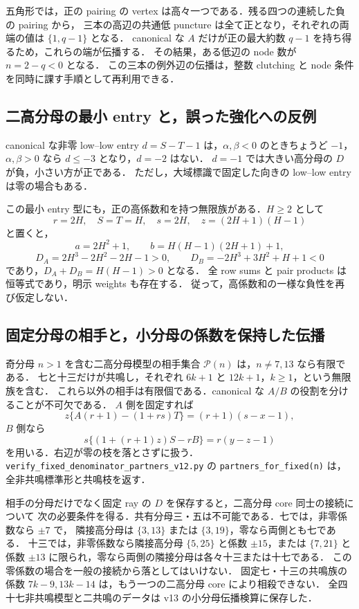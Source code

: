 五角形では，正の pairing の vertex は高々一つである．残る四つの連続した負の pairing から，
三本の高辺の共通低 puncture は全て正となり，それぞれの両端の値は $\{1,q-1\}$ となる．
canonical な $A$ だけが正の最大約数 $q-1$ を持ち得るため，これらの端が伝播する．
その結果，ある低辺の node 数が $n=2-q<0$ となる．
この三本の例外辺の伝播は，整数 clutching と node 条件を同時に課す手順として再利用できる．

\subsection{二高分母の最小 entry と，誤った強化への反例}

canonical な非零 low--low entry $d=S-T-1$ は，$\alpha,\beta<0$ のときちょうど $-1$，
$\alpha,\beta>0$ なら $d\leq-3$ となり，$d=-2$ はない．
$d=-1$ では大きい高分母の $D$ が負，小さい方が正である．
ただし，大域標識で固定した向きの low--low entry は零の場合もある．

この最小 entry 型にも，正の高係数和を持つ無限族がある．$H\geq2$ として
\[
 r=2H,\quad S=T=H,\quad s=2H,\quad z=(2H+1)(H-1)
\]
と置くと，
\[
 a=2H^2+1,\qquad b=H(H-1)(2H+1)+1,
\]
\[
 D_A=2H^3-2H^2-2H-1>0,\qquad
 D_B=-2H^3+3H^2+H+1<0
\]
であり，$D_A+D_B=H(H-1)>0$ となる．
全 row sums と pair products は恒等式であり，明示 weights も存在する．
従って，高係数和の一様な負性を再び仮定しない．

\subsection{固定分母の相手と，小分母の係数を保持した伝播}

奇分母 $n>1$ を含む二高分母模型の相手集合 $\mathcal P(n)$ は，$n\ne7,13$ なら有限である．
七と十三だけが共鳴し，それぞれ $6k+1$ と $12k+1$，$k\geq1$，という無限族を含む．
これら以外の相手は有限個である．canonical な $A/B$ の役割を分けることが不可欠である．
$A$ 側を固定すれば
\[
 z\{A(r+1)-(1+rs)T\}=(r+1)(s-x-1),
\]
$B$ 側なら
\[
 s\{(1+(r+1)z)S-rB\}=r(y-z-1)
\]
を用いる．右辺が零の枝を落とさずに扱う．
\nolinkurl{verify_fixed_denominator_partners_v12.py} の
\texttt{partners\_for\_fixed(n)} は，全非共鳴標準形と共鳴枝を返す．

相手の分母だけでなく固定 ray の $D$ を保存すると，二高分母 core 同士の接続について
次の必要条件を得る．共有分母三・五は不可能である．七では，非零係数なら $\pm7$ で，
隣接高分母は $\{3,13\}$ または $\{3,19\}$，零なら両側とも七である．
十三では，非零係数なら隣接高分母 $\{5,25\}$ と係数 $\pm15$，または
$\{7,21\}$ と係数 $\pm13$ に限られ，零なら両側の隣接分母は各々十三または十七である．
この零係数の場合を一般の接続から落としてはいけない．
固定七・十三の共鳴族の係数 $7k-9,13k-14$ は，もう一つの二高分母 core により相殺できない．
全四十七非共鳴模型と二共鳴のデータは v13 の小分母伝播検算に保存した．









